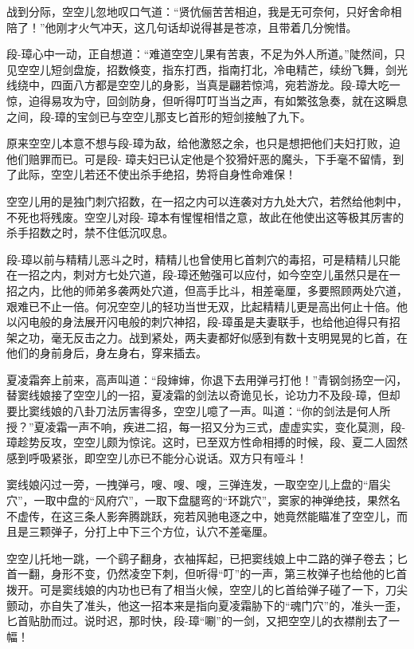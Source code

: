\documentclass[12pt,oneside]{book}
\begin{document}
战到分际，空空儿忽地叹口气道：``贤伉俪苦苦相迫，我是无可奈何，只好舍命相陪了！''他刚才火气冲天，这几句话却说得甚是苍凉，且带着几分惋惜。

段-璋心中一动，正自想道：``难道空空儿果有苦衷，不足为外人所道。''陡然间，只见空空儿短剑盘旋，招数倏变，指东打西，指南打北，冷电精芒，续纷飞舞，剑光线绕中，四面八方都是空空儿的身影，当真是翩若惊鸿，宛若游龙。段-璋大吃一惊，迫得易攻为守，回剑防身，但听得叮叮当当之声，有如繁弦急奏，就在这瞬息之间，段-璋的宝剑已与空空儿那支匕首形的短剑接触了九下。

原来空空儿本意不想与段-璋为敌，给他激怒之余，也只是想把他们夫妇打败，迫他们赔罪而已。可是段-
璋夫妇已认定他是个狡猾奸恶的魔头，下手毫不留情，到了此际，空空儿若还不使出杀手绝招，势将自身性命难保！

空空儿用的是独门刺穴招数，在一招之内可以连袭对方九处大穴，若然给他刺中，不死也将残废。空空儿对段-
璋本有惺惺相惜之意，故此在他使出这等极其厉害的杀手招数之时，禁不住低沉叹息。

段-璋以前与精精儿恶斗之时，精精儿也曾使用匕首刺穴的毒招，可是精精儿只能在一招之内，刺对方七处穴道，段-璋还勉强可以应付，如今空空儿虽然只是在一招之内，比他的师弟多袭两处穴道，但高手比斗，相差毫厘，多要照顾两处穴道，艰难已不止一倍。何况空空儿的轻功当世无双，比起精精儿更是高出何止十倍。他以闪电般的身法展开闪电般的刺穴神招，段-璋虽是夫妻联手，也给他迫得只有招架之功，毫无反击之力。战到紧处，两夫妻都好似感到有数十支明晃晃的匕首，在他们的身前身后，身左身右，穿来插去。

夏凌霜奔上前来，高声叫道：``段婶婶，你退下去用弹弓打他！''青钢剑扬空一闪，替窦线娘接了空空儿的一招，夏凌霜的剑法以奇诡见长，论功力不及段-璋，但却要比窦线娘的八卦刀法厉害得多，空空儿噫了一声。叫道：``你的剑法是何人所授？''夏凌霜一声不响，疾进二招，每一招又分为三式，虚虚实实，变化莫测，段-璋趁势反攻，空空儿颇为惊诧。这时，已至双方性命相搏的时候，段、夏二人固然感到呼吸紧张，即空空儿亦已不能分心说话。双方只有哑斗！

窦线娘闪过一旁，一拽弹弓，嗖、嗖、嗖，三弹连发，一取空空儿上盘的``眉尖穴''，一取中盘的``风府穴''，一取下盘腿弯的``环跳穴''，窦家的神弹绝技，果然名不虚传，在这三条人影奔腾跳跃，宛若风驰电逐之中，她竟然能瞄准了空空儿，而且是三颗弹子，分打上中下三个方位，认穴不差毫厘。

空空儿托地一跳，一个鹞子翻身，衣袖挥起，已把窦线娘上中二路的弹子卷去；匕首一翻，身形不变，仍然凌空下刺，但听得``叮''的一声，第三枚弹子也给他的匕首拨开。可是窦线娘的内功也已有了相当火候，空空儿的匕首给弹子碰了一下，刀尖颤动，亦自失了准头，他这一招本来是指向夏凌霜胁下的``魂门穴''的，准头一歪，匕首贴肋而过。说时迟，那时快，段-璋``唰''的一剑，又把空空儿的衣襟削去了一幅！
\end{document}
